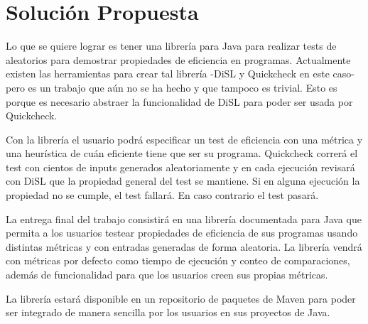 \section{Solución Propuesta}\label{chap:sol}
Lo que se quiere lograr es tener una librería para Java para realizar tests de
aleatorios para demostrar propiedades de eficiencia en programas.
Actualmente existen las herramientas para crear tal librería -DiSL y Quickcheck
en este caso- pero es un trabajo que aún no se ha hecho y que tampoco es trivial.
Esto es porque es necesario abstraer la funcionalidad de DiSL para poder ser
usada por Quickcheck.

Con la librería el usuario podrá especificar un test de eficiencia con una
métrica y una heurística de cuán eficiente tiene que ser su programa. Quickcheck
correrá el test con cientos de inputs generados aleatoriamente y en cada
ejecución revisará con DiSL que la propiedad general del test se mantiene.
Si en alguna ejecución la propiedad no se cumple, el test fallará. En caso
contrario el test pasará.

La entrega final del trabajo consistirá en una librería documentada para Java
que permita a los usuarios testear propiedades de eficiencia de sus programas
usando distintas métricas y con entradas generadas de forma aleatoria.
La librería vendrá con métricas por defecto como tiempo de ejecución y conteo
de comparaciones, además de funcionalidad para que los usuarios creen sus
propias métricas.

La librería estará disponible en un repositorio de paquetes de Maven para
poder ser integrado de manera sencilla por los usuarios en sus proyectos de
Java.

